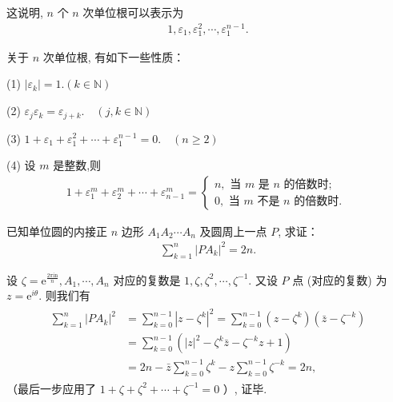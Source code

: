 这说明, $n$ 个 $n$ 次单位根可以表示为
\begin{align*}
	1, \varepsilon_1, \varepsilon_1^2, \cdots, \varepsilon_1^{n-1} .
\end{align*}

关于 $n$ 次单位根, 有如下一些性质：

(1) $\left|\varepsilon_k\right|=1 .(k \in \mathbb{N})$

(2) $\varepsilon_j \varepsilon_k=\varepsilon_{j+k} . \quad(j, k \in \mathbb{N})$

(3) $1+\varepsilon_1+\varepsilon_1^2+\cdots+\varepsilon_1^{n-1}=0 . \quad(n \geqslant 2)$

(4) 设 $m$ 是整数,则
\begin{align*}
	1+\varepsilon_1^m+\varepsilon_2^m+\cdots+\varepsilon_{n-1}^m=\left\{\begin{array}{l}
		                                                                    n, \text { 当 } m \text { 是 } n \text { 的倍数时; } \\
		                                                                    0, \text { 当 } m \text { 不是 } n \text { 的倍数时. }
	                                                                    \end{array}\right.
\end{align*}

\begin{example}
	已知单位圆的内接正 $n$ 边形 $A_1 A_2 \cdots A_n$ 及圆周上一点 $P$, 求证：
	\begin{align*}
		\sum_{k=1}^n\left|P A_k\right|^2=2 n .
	\end{align*}
\end{example}

\begin{solution}
	设 $\zeta=\mathrm{e}^{\frac{2 \pi \mathrm{in}}{n}}, A_1, \cdots, A_n$ 对应的复数是 $1, \zeta, \zeta^2, \cdots, \zeta^{-1}$. 又设 $P$ 点 (对应的复数) 为 $z=\mathrm{e}^{i \theta}$. 则我们有
	\begin{align*}
		\begin{aligned}
			\sum_{k=1}^n\left|P A_k\right|^2 & =\sum_{k=0}^{n-1}\left|z-\zeta^k\right|^2=\sum_{k=0}^{n-1}\left(z-\zeta^k\right)\left(\bar{z}-\zeta^{-k}\right) \\
			                                 & =\sum_{k=0}^{n-1}\left(|z|^2-\zeta^k \bar{z}-\zeta^{-k} z+1\right)                                              \\
			                                 & =2 n-\bar{z} \sum_{k=0}^{n-1} \zeta^k-z \sum_{k=0}^{n-1} \zeta^{-k}=2 n,
		\end{aligned}
	\end{align*}
	（最后一步应用了 $1+\zeta+\zeta^2+\cdots+\zeta^{-1}=0$ ）, 证毕.
\end{solution}

